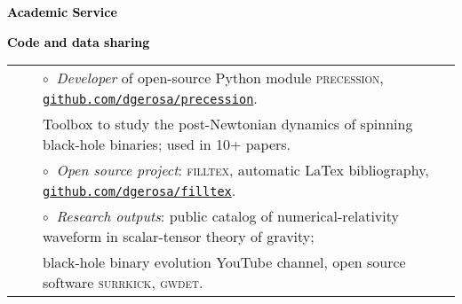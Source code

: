 \documentclass[letterpaper]{moderncv}
\begin{document}
\vspace{0.2cm}
\textbf{\textcolor{black}{Academic Service}}\vspace{0.05cm}\\
\vspace{-0.1cm}
\vspace{-0.1cm}
\vspace{-0.1cm}



\vspace{0.2cm}
\textbf{\textcolor{black}{Code and data sharing}}\vspace{0.05cm}\\
\begin{tabular}{rcl}
&\hspace{0.4cm} &$\circ\;\;${\textit{Developer}} of open-source Python module \textsc{precession}, \href{https://github.com/dgerosa/precession}{\texttt{github.com/dgerosa/precession}}.
\\ &\hspace{0.4cm} &  \hspace{0.4cm}Toolbox to study the post-Newtonian dynamics of  spinning black-hole binaries; used in 10+  papers. \\
&\hspace{0.4cm} &$\circ\;\;${\textit{Open source project}}: \textsc{filltex}, automatic LaTex bibliography, \href{https://github.com/dgerosa/filltex}{\texttt{github.com/dgerosa/filltex}}.\\
&\hspace{0.4cm} &$\circ\;\;$\textit{Research outputs}: public catalog of numerical-relativity waveform in scalar-tensor theory of gravity; 
\\ &\hspace{0.4cm} &  \hspace{0.4cm}black-hole binary evolution YouTube channel, open source software \textsc{surrkick}, \textsc{gwdet}.
\end{tabular}
\end{document}
